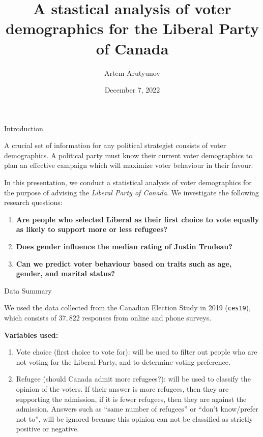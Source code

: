 \documentclass[
  ignorenonframetext,
]{beamer}
\title{A stastical analysis of voter demographics for the Liberal Party of
Canada}
\author{Artem Arutyunov}
\date{December 7, 2022}
\begin{document}
\frame{\titlepage}

\begin{frame}{Introduction}
\protect\hypertarget{introduction}{}

A crucial set of information for any political strategist consists of
voter demographics. A political party must know their current voter
demographics to plan an effective campaign which will maximize voter
behaviour in their favour.

In this presentation, we conduct a statistical analysis of voter
demographics for the purpose of advising the \emph{Liberal Party of
Canada}. We investigate the following research questions:

\begin{enumerate}
\item
  \textbf{Are people who selected Liberal as their first choice to vote
  equally as likely to support more or less refugees?}
\item
  \textbf{Does gender influence the median rating of Justin Trudeau?}
\item
  \textbf{Can we predict voter behaviour based on traits such as age,
  gender, and marital status?}
\end{enumerate}

\end{frame}

\begin{frame}[fragile]{Data Summary}
\protect\hypertarget{data-summary}{}

We used the data collected from the Canadian Election Study in 2019
(\texttt{ces19}), which consists of \(37,822\) responses from online and
phone surveys.

\textbf{Variables used:}

\begin{enumerate}
\item
  Vote choice (first choice to vote for): will be used to filter out
  people who are not voting for the Liberal Party, and to determine
  voting preference.
\item
  Refugee (should Canada admit more refugees?): will be used to classify
  the opinion of the voters. If their answer is more refugees, then they
  are supporting the admission, if it is fewer refugees, then they are
  against the admission. Answers such as ``same number of refugees'' or
  ``don't know/prefer not to'', will be ignored because this opinion can
  not be classified as strictly positive or negative.
\end{enumerate}

\end{frame}
\end{document}
